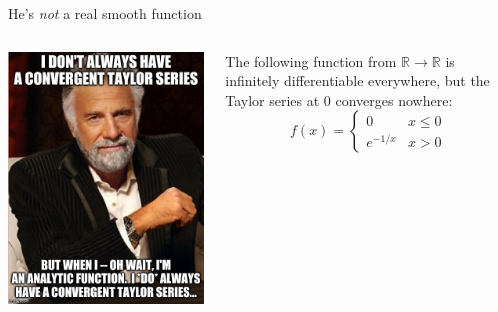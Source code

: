 \documentclass{beamer}
\newcommand{\R}{\mathbb{R}}
\begin{document}
\begin{frame}{He's \emph{not} a real smooth function}
\begin{columns}
\begin{column}{0.6\textwidth}
    \includegraphics[width=\textwidth,height=0.8\textheight,keepaspectratio]{AlwaysTaylor.jpg}
\end{column}
\begin{column}{0.4\textwidth}
The following function from $\R\to\R$ is infinitely differentiable everywhere, but the Taylor series at 0 converges nowhere:
$$f(x)=\begin{cases} 0 & x\leq 0 \\
e^{-1/x} & x>0 \end{cases}$$
\end{column}
\end{columns}

\end{frame}
\end{document}
